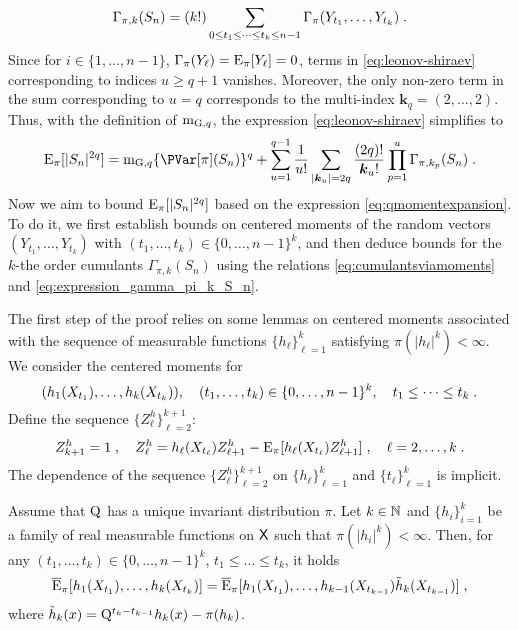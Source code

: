 \begin{equation}
  \label{eq:expression_gamma_pi_k_S_n}
\Gamma_{\pi,k}(S_n)= (k!) \sum_{0 \le t_1\leq  \cdots \leq t_k \le n-1} \Gamma_{\pi}(Y_{t_1}, \ldots, Y_{t_k}) \eqsp.
\end{equation}
Since for $i \in \{1,\ldots,n-1\}$, $\Gamma_{\pi}(Y_\ell) = \PE_{\pi}[Y_\ell] = 0$, terms in \eqref{eq:leonov-shiraev} corresponding to indices $u \geq q+1$ vanishes. Moreover, the only non-zero term in the sum corresponding to $u = q$ corresponds to the multi-index $\boldsymbol k_q = (2,\ldots,2)$. Thus, with the definition of $\momentGq[q]$, the expression \eqref{eq:leonov-shiraev} simplifies to
\begin{equation}
\label{eq:qmomentexpansion}
\PE_\pi[|S_n|^{2q}] = \momentGq[q] \{ \PVar[\pi](S_n) \}^q + \sum_{u=1}^{q-1} \frac{1}{u!} \sum_{|\bk_u| = 2q} \frac{(2q)!}{{\boldsymbol k_u}!} \prod_{p=1}^u \Gamma_{\pi, k_p}(S_n) \eqsp.
\end{equation}
Now we aim to bound $\PE_\pi[|S_n|^{2q}]$ based on the expression \eqref{eq:qmomentexpansion}. To do it, we first establish  bounds on centered moments of the random vectors $(Y_{t_1},\ldots,Y_{t_k})$ with $(t_1,\ldots,t_k) \in\{0,\ldots,n-1\}^k$, and then deduce bounds for the $k$-the order cumulants $\Gamma_{\pi,k}(S_n)$ using the relations \eqref{eq:cumulantsviamoments} and \eqref{eq:expression_gamma_pi_k_S_n}.
\par 
The first step of the proof relies on some lemmas on centered moments associated with the sequence of measurable functions $\{h_{\ell}\}_{\ell=1}^{k}$ satisfying $\pi(|h_{\ell}|^{k})<\infty$. We consider the centered moments for 
\[
(h_1(X_{t_1}), \ldots, h_k(X_{t_k})), \quad (t_1,\dots,t_k) \in \{0,\dots,n-1\}^{k}, \quad t_1 \leq \dots \leq t_k\eqsp.
\]
Define the sequence $\{Z^h_{\ell}\}_{\ell=2}^{k+1}$:
 \begin{equation}
 \label{eq:z_ell_definition}
 Z^h_{k+1} = 1\eqsp, \quad Z^h_{\ell} = h_\ell(X_{t_\ell}) Z^h_{\ell+1} - \PE_\pi[ h_\ell(X_{t_\ell}) Z^h_{\ell+1}]\eqsp,\quad  \ell= 2, \dots, k\eqsp.
 \end{equation}
 The dependence of the sequence $\{Z^h_\ell\}_{\ell=2}^{k+1}$ on $\{h_\ell \}_{\ell=1}^k$ and $\{t_\ell\}_{\ell=1}^k$ is implicit.
\begin{lemma}
\label{lem:centred_moments_markov_property}
Assume that $\MK$ has a unique invariant distribution $\pi$. Let $k \in \nset$ and $\{h_i \}_{i=1}^k$ be a family of real measurable functions on $\Xset$
such that $\pi(|h_i|^k) < \infty$. Then, for any $(t_1,\dots,t_{k}) \in \{0,\ldots,n-1\}^{k}$, $t_1 \leq \dots\leq t_{k}$, it holds
\begin{equation*}
\PEC_\pi[h_1(X_{t_1}), \ldots, h_{k}(X_{t_{k}})] = \PEC_\pi[h_1(X_{t_1}), \ldots , h_{k-1}(X_{t_{k-1}}) \tilde h_{k}(X_{t_{k-1}})] \eqsp,
\end{equation*}
where $\tilde h_{k}(x) = \MK^{t_{k} - t_{k-1}} h_{k}(x) - \pi(h_{k})$.
\end{lemma}
